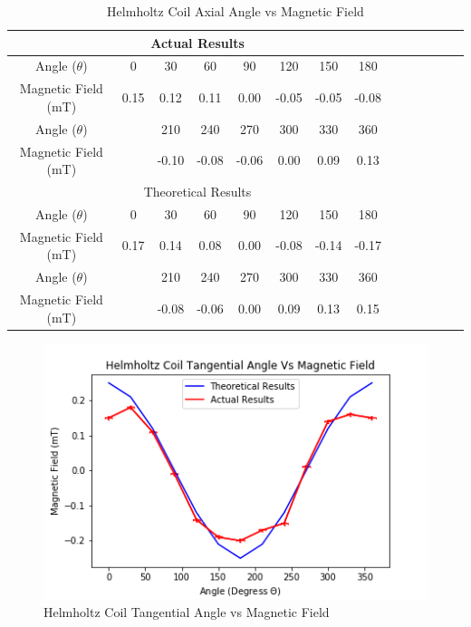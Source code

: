\documentclass[12pt]{article}
\begin{document}
\begin{table}[H]
\begin{center}
 \begin{tabular}{|c||c|c|c|c|c|c|c|c|c|c|c|c|c|}
 \hline
 \multicolumn{8}{|c|}{Actual Results} \\
 \hline
 Angle ($\theta$) & 0 & 30 & 60 & 90 & 120 & 150 & 180 \\
 \hline
 Magnetic Field (mT) & 0.15 & 0.12 & 0.11 & 0.00 & -0.05 & -0.05 & -0.08 \\
 \hline \hline
 Angle ($\theta$) &  & 210 & 240 & 270 & 300 & 330 & 360 \\
 \hline
 Magnetic Field (mT) & & -0.10 & -0.08 & -0.06 & 0.00 & 0.09 & 0.13 \\
 \hline
 \hline
 \multicolumn{8}{|c|}{Theoretical Results} \\
 \hline
 Angle ($\theta$) & 0 & 30 & 60 & 90 & 120 & 150 & 180 \\
 \hline
 Magnetic Field (mT) & 0.17 & 0.14 & 0.08 & 0.00 & -0.08 & -0.14 & -0.17 \\
 \hline \hline
 Angle ($\theta$) &  & 210 & 240 & 270 & 300 & 330 & 360 \\
 \hline
 Magnetic Field (mT) & & -0.08 & -0.06 & 0.00 & 0.09 & 0.13 & 0.15 \\
 \hline
 \end{tabular}
 \caption{Helmholtz Coil Axial Angle vs Magnetic Field}
 \label{Helmholtz Coil Axial Angle Vs Magnetic Field Table}
\end{center}
\end{table}

\begin{figure}[H]
\centering
\includegraphics[scale=0.7]{Images/Helmholtz_Coils/Helmholtz_Coil_Angle_2_Vs_Magnetic_Field.png}
\caption{Helmholtz Coil Tangential Angle vs Magnetic Field}
\label{Helmholtz Coil Tangential Angle Vs Magnetic Field Graph}
\end{figure}
\end{document}
